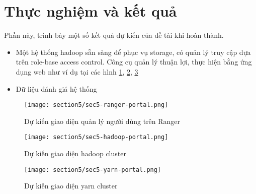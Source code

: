 \section{Thực nghiệm và kết quả}
\label{section4-experiment}

Phần này, trình bày một số kết quả dự kiến của đề tài khi hoàn thành.

\begin{itemize}
    \item Một hệ thống hadoop sẵn sàng để phục vụ storage, có quản lý truy cập dựa trên role-base access control. Công cụ quản lý thuận lợi, thực hiện bằng ứng dụng web như ví dụ tại các hình \ref{fig:sec5-ranger-portal}, \ref{fig:sec5-hadoop-portal}, \ref{fig:sec5-yarn-portal}
    \item Dữ liệu đánh giá hệ thống 
\end{itemize}

\begin{figure}
    \centering
    \texttt{[image: section5/sec5-ranger-portal.png]}
    \caption{Dự kiến giao diện quản lý người dùng trên Ranger}
    \label{fig:sec5-ranger-portal}
\end{figure}

\begin{figure}
    \centering
    \texttt{[image: section5/sec5-hadoop-portal.png]}
    \caption{Dự kiến giao diện hadoop cluster}
    \label{fig:sec5-hadoop-portal}
\end{figure}

\begin{figure}
    \centering
    \texttt{[image: section5/sec5-yarn-portal.png]}
    \caption{Dự kiến giao diện yarn cluster}
    \label{fig:sec5-yarn-portal}
\end{figure}
